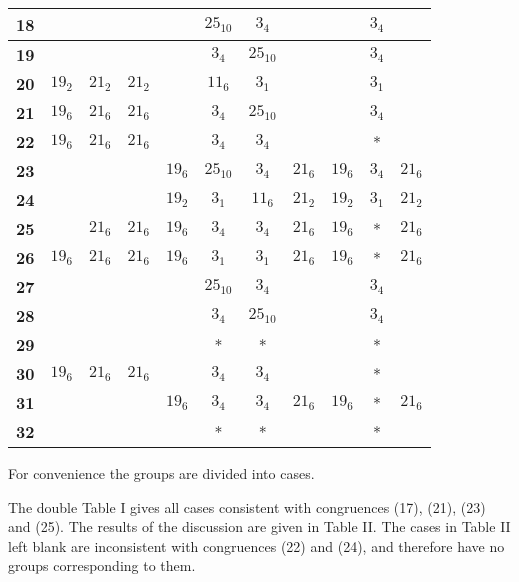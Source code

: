 \documentclass[oneside]{article}
\begin{document}
\begin{center}
\begin{tabular}{|r|c|c|c|c|c|c|c|c|c|c|}
\textbf{18}&      &        &      &      &$25_{10}$ &$3_4$    &       &      &$3_4$ &       \\ \hline
\textbf{19}&      &        &      &      &$3_4$     &$25_{10}$&       &      &$3_4$ &       \\ \hline
\textbf{20}&$19_2$&$21_2$  &$21_2$&      &$11_6$    &$3_1$    &       &      &$3_1$ &       \\ \hline
\textbf{21}&$19_6$&$21_6$  &$21_6$&      &$3_4$     &$25_{10}$&       &      &$3_4$ &       \\ \hline
\textbf{22}&$19_6$&$21_6$  &$21_6$&      &$3_4$     &$3_4$    &       &      &*     &       \\ \hline
\textbf{23}&      &        &      &$19_6$&$25_{10}$ &$3_4$    &$21_6$ &$19_6$&$3_4$ &$21_6$ \\ \hline
\textbf{24}&      &        &      &$19_2$&$3_1$     &$11_6$   &$21_2$ &$19_2$&$3_1$ &$21_2$ \\ \hline
\textbf{25}&      &$21_6$  &$21_6$&$19_6$&$3_4$     &$3_4$    &$21_6$ &$19_6$&*     &$21_6$ \\ \hline
\textbf{26}&$19_6$&$21_6$  &$21_6$&$19_6$&$3_1$     &$3_1$    &$21_6$ &$19_6$&*     &$21_6$ \\ \hline
\textbf{27}&      &        &      &      &$25_{10}$ &$3_4$    &       &      &$3_4$ &       \\ \hline
\textbf{28}&      &        &      &      &$3_4$     &$25_{10}$&       &      &$3_4$ &       \\ \hline
\textbf{29}&      &        &      &      &*         &*        &       &      &*     &       \\ \hline
\textbf{30}&$19_6$&$21_6$  &$21_6$&      &$3_4$     &$3_4$    &       &      &*     &       \\ \hline
\textbf{31}&      &        &      &$19_6$&$3_4$     &$3_4$    &$21_6$ &$19_6$&*     &$21_6$ \\ \hline
\textbf{32}&      &        &      &      &*         &*        &       &      &*     &       \\ \hline
\end{tabular}
\end{center}

For convenience the groups are divided into cases.

The double Table I gives all cases consistent with congruences (17), (21),
(23) and (25). The results of the discussion are given in Table II. The
cases in Table II left blank are inconsistent with congruences (22) and
(24), and therefore have no groups corresponding to them.
\end{document}
